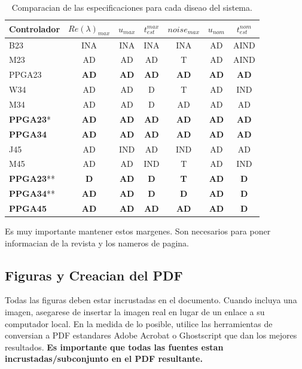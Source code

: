 \documentclass[5p,times,authoryear]{elsarticle}
\begin{document}
\begin{table}
\centering
\caption{Comparacian de las especificaciones para cada diseao del sistema. }
\label{tabladeseables}
\begin{tabular}{lcccccc}   \hline
Controlador  & $Re(\lambda)_{max}$  & $u_{max}$ & $t_{est}^{max}$ & $noise_{max}$ & $u_{nom}$ & $t_{est}^{nom}$  \\ \hline
B23 & INA & INA & INA & INA & AD & AIND \\
M23 & AD & AD & AD & T & AD & AIND \\
PPGA23 & \textbf{AD} & \textbf{AD}& \textbf{AD}&\textbf{AD} &\textbf{AD} & \textbf{AD}\\
 \hline
 W34 & AD & AD & D & T & AD & IND \\
 M34 & AD & AD & D & AD & AD & AD \\
 \textbf{PPGA23}* & \textbf{AD} & \textbf{AD} & \textbf{AD} & \textbf{AD} & \textbf{AD} & \textbf{AD} \\
 \textbf{PPGA34} & \textbf{AD} & \textbf{AD} & \textbf{AD} & \textbf{AD} & \textbf{AD} & \textbf{AD} \\
  \hline
J45 & AD & IND & AD & IND & AD & AD \\
M45 & AD & AD & IND & T & AD & IND \\
\textbf{PPGA23}**& \textbf{D} & \textbf{AD} & \textbf{D} & \textbf{T} & \textbf{AD} & \textbf{D} \\
\textbf{PPGA34}**& \textbf{AD} & \textbf{AD} & \textbf{D} & \textbf{D} & \textbf{AD} & \textbf{D}  \\
\textbf{PPGA45} & \textbf{AD} & \textbf{AD} & \textbf{AD} & \textbf{AD} & \textbf{AD} & \textbf{D} \\
 \hline
\end{tabular}
\end{table}

Es muy importante mantener estos margenes. Son necesarios para poner informacian de la revista y los nameros de pagina.

\subsection{Figuras y Creacian del PDF}

Todas las figuras deben estar incrustadas en el documento. Cuando incluya una imagen, asegarese de insertar la imagen real en lugar de un enlace a su computador local. En la medida de lo posible, utilice las herramientas de conversian a PDF estandares Adobe Acrobat o Ghostscript que dan los mejores resultados. {\bf Es importante que todas las fuentes estan incrustadas/subconjunto en el PDF resultante.}
\end{document}
